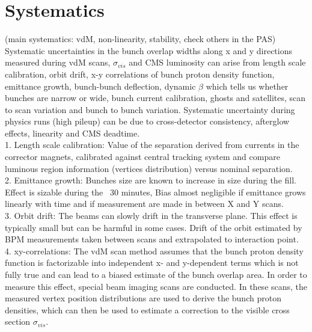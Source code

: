 \section{Systematics}
\label{sec:syst}
(main systematics: vdM, non-linearity, stability, check others in the PAS) \\


Systematic uncertainties in the bunch overlap widths along x and y directions measured during vdM scans, $\sigma_{vis}$ and CMS luminosity can arise from length scale calibration, orbit drift, x-y correlations of bunch proton density function, emittance growth, bunch-bunch deflection, dynamic $\beta$ which tells us whether bunches are narrow or wide, bunch current calibration, ghosts and satellites, scan to scan variation and bunch to bunch variation. Systematic uncertainty during physics runs (high pileup) can be due to cross-detector consistency, afterglow effects, linearity and CMS deadtime.  \\

1. Length scale calibration:  Value of the separation derived from currents in the corrector magnets, calibrated against central tracking system and compare luminous region information (vertices distribution) versus nominal separation. \\

2. Emittance growth: Bunches size are known to increase in size during the fill. Effect is sizable during the ~30 minutes, Bias almost negligible if emittance grows linearly with time and if measurement are made in between X and Y scans. \\

3. Orbit drift: The beams can slowly drift in the transverse plane. This effect is typically small but can be harmful in some cases. Drift of the orbit estimated by BPM measurements taken between scans and extrapolated to interaction point. \\

4. xy-correlations: The vdM scan method assumes that the bunch proton density function is factorizable into independent x- and y-dependent terms which is not fully true and can lead to a biased estimate of the bunch overlap area. In order to measure this effect, special beam imaging scans are conducted. In these scans, the measured vertex position distributions are used to derive the bunch proton densities, which can then be used to estimate a correction to the visible cross section $\sigma_{vis}$. \\

